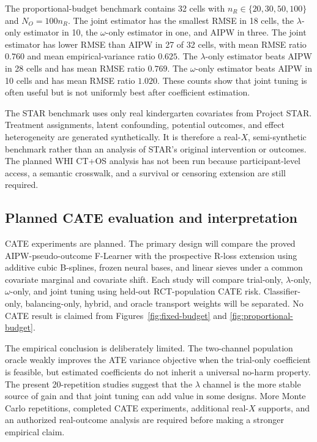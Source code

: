 The proportional-budget benchmark contains 32 cells with $n_R\in\{20,30,50,100\}$ and $N_O=100n_R$. The joint estimator has the smallest RMSE in 18 cells, the $\lambda$-only estimator in 10, the $\omega$-only estimator in one, and AIPW in three. The joint estimator has lower RMSE than AIPW in 27 of 32 cells, with mean RMSE ratio $0.760$ and mean empirical-variance ratio $0.625$. The $\lambda$-only estimator beats AIPW in 28 cells and has mean RMSE ratio $0.769$. The $\omega$-only estimator beats AIPW in 10 cells and has mean RMSE ratio $1.020$. These counts show that joint tuning is often useful but is not uniformly best after coefficient estimation.

The STAR benchmark uses only real kindergarten covariates from Project STAR. Treatment assignments, latent confounding, potential outcomes, and effect heterogeneity are generated synthetically. It is therefore a real-$X$, semi-synthetic benchmark rather than an analysis of STAR's original intervention or outcomes. The planned WHI CT+OS analysis has not been run because participant-level access, a semantic crosswalk, and a survival or censoring extension are still required.

\subsection{Planned CATE evaluation and interpretation}

CATE experiments are planned. The primary design will compare the proved AIPW-pseudo-outcome F-Learner with the prospective R-loss extension using additive cubic B-splines, frozen neural bases, and linear sieves under a common covariate marginal and covariate shift. Each study will compare trial-only, $\lambda$-only, $\omega$-only, and joint tuning using held-out RCT-population CATE risk. Classifier-only, balancing-only, hybrid, and oracle transport weights will be separated. No CATE result is claimed from Figures~\ref{fig:fixed-budget} and \ref{fig:proportional-budget}.

The empirical conclusion is deliberately limited. The two-channel population oracle weakly improves the ATE variance objective when the trial-only coefficient is feasible, but estimated coefficients do not inherit a universal no-harm property. The present 20-repetition studies suggest that the $\lambda$ channel is the more stable source of gain and that joint tuning can add value in some designs. More Monte Carlo repetitions, completed CATE experiments, additional real-$X$ supports, and an authorized real-outcome analysis are required before making a stronger empirical claim.

